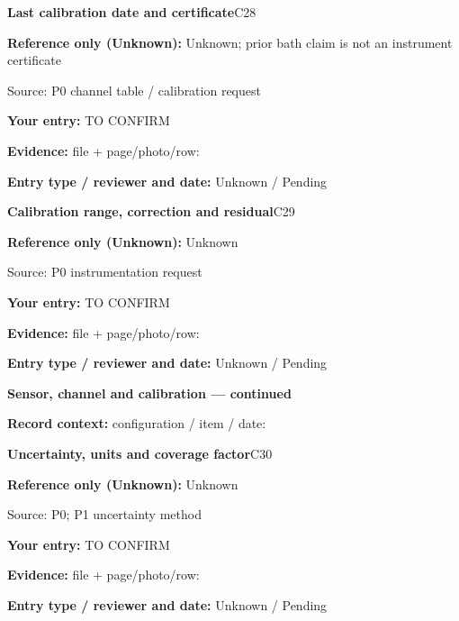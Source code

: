 \documentclass[11pt]{article}
\begin{document}
\begin{minipage}{\textwidth}\small
{\color{navy}\bfseries Last calibration date and certificate}\hfill C28\par
\colorbox{pale}{\parbox{\dimexpr\linewidth-2\fboxsep\relax}{
\textbf{Reference only (Unknown):} Unknown; prior bath claim is not an instrument certificate\par
{\footnotesize Source: P0 channel table / calibration request}}}\par
\textbf{Your entry:} {\color{muted}TO CONFIRM}\enspace\hrulefill\par
{\footnotesize\textbf{Evidence:} file + page/photo/row: \hrulefill\par
\textbf{Entry type / reviewer and date:} Unknown / Pending\par
}\end{minipage}\par\vspace{5pt}
\begin{minipage}{\textwidth}\small
{\color{navy}\bfseries Calibration range, correction and residual}\hfill C29\par
\colorbox{pale}{\parbox{\dimexpr\linewidth-2\fboxsep\relax}{
\textbf{Reference only (Unknown):} Unknown\par
{\footnotesize Source: P0 instrumentation request}}}\par
\textbf{Your entry:} {\color{muted}TO CONFIRM}\enspace\hrulefill\par
{\footnotesize\textbf{Evidence:} file + page/photo/row: \hrulefill\par
\textbf{Entry type / reviewer and date:} Unknown / Pending\par
}\end{minipage}\par\vspace{5pt}
\clearpage
{\large\bfseries Sensor, channel and calibration --- continued}\par
\textbf{Record context:} configuration / item / date: \hrulefill\par
\begin{minipage}{\textwidth}\small
{\color{navy}\bfseries Uncertainty, units and coverage factor}\hfill C30\par
\colorbox{pale}{\parbox{\dimexpr\linewidth-2\fboxsep\relax}{
\textbf{Reference only (Unknown):} Unknown\par
{\footnotesize Source: P0; P1 uncertainty method}}}\par
\textbf{Your entry:} {\color{muted}TO CONFIRM}\enspace\hrulefill\par
{\footnotesize\textbf{Evidence:} file + page/photo/row: \hrulefill\par
\textbf{Entry type / reviewer and date:} Unknown / Pending\par
}\end{minipage}\par\vspace{5pt}
\end{document}
